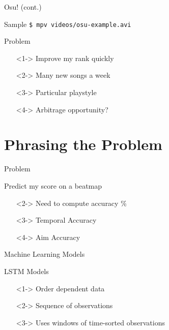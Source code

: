 \documentclass[table]{beamer}
\begin{document}
\begin{frame}{Osu! (cont.)}
  \begin{block}{Sample}
    \texttt{\$ mpv videos/osu-example.avi}
  \end{block}
\end{frame}

\begin{frame}{Problem}
  \begin{itemize}
  \item[]<1-> Improve my rank quickly
  \item[]<2-> Many new songs a week
  \item[]<3-> Particular playstyle
  \item[]<4-> Arbitrage opportunity?
  \end{itemize}
\end{frame}

\section{Phrasing the Problem}

\begin{frame}{Problem}
  \begin{block}{Predict my score on a beatmap}
    \begin{itemize}
    \item[]<2-> Need to compute accuracy \%
    \item[]<3-> Temporal Accuracy
    \item[]<4-> Aim Accuracy
    \end{itemize}
  \end{block}
\end{frame}

\begin{frame}{Machine Learning Models}
\end{frame}

\begin{frame}{LSTM Models}
  \begin{itemize}
  \item[]<1-> Order dependent data
  \item[]<2-> Sequence of observations
  \item[]<3-> Uses windows of time-sorted observations
  \end{itemize}
\end{frame}
\end{document}
